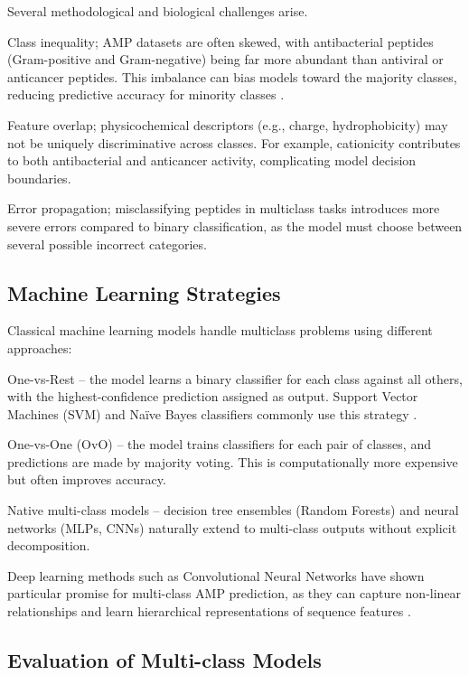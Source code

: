 \documentclass[a4paper,twoside,12pt]{book}
\begin{document}
Several methodological and biological challenges arise. 

Class inequality;  AMP datasets are often skewed, with antibacterial peptides (Gram-positive and Gram-negative) being far more abundant than antiviral or anticancer peptides. This imbalance can bias models toward the majority classes, reducing predictive accuracy for minority classes \cite{bib:bhadra2018}.

Feature overlap; physicochemical descriptors (e.g., charge, hydrophobicity) may not be uniquely discriminative across classes. For example, cationicity contributes to both antibacterial and anticancer activity, complicating model decision boundaries.

Error propagation; misclassifying peptides in multiclass tasks introduces more severe errors compared to binary classification, as the model must choose between several possible incorrect categories.

\subsection{Machine Learning Strategies}

Classical machine learning models handle multiclass problems using different approaches:

One-vs-Rest – the model learns a binary classifier for each class against all others, with the highest-confidence prediction assigned as output. Support Vector Machines (SVM) and Naïve Bayes classifiers commonly use this strategy \cite{bib:hsu2002}.

One-vs-One (OvO) – the model trains classifiers for each pair of classes, and predictions are made by majority voting. This is computationally more expensive but often improves accuracy.

Native multi-class models – decision tree ensembles (Random Forests) and neural networks (MLPs, CNNs) naturally extend to multi-class outputs without explicit decomposition.

Deep learning methods such as Convolutional Neural Networks have shown particular promise for multi-class AMP prediction, as they can capture non-linear relationships and learn hierarchical representations of sequence features \cite{bib:veltri2018}.

\subsection{Evaluation of Multi-class Models}
\end{document}
